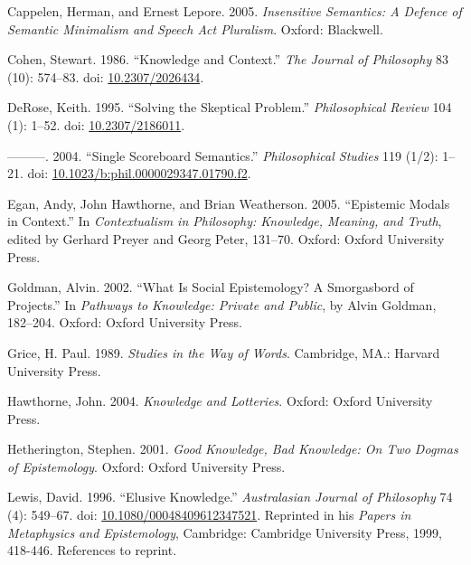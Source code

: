 \documentclass[
  10pt,
  letterpaper,
  DIV=11,
  numbers=noendperiod,
  twoside]{scrartcl}
\newlength{\cslhangindent}
\newenvironment{CSLReferences}[2] %
 {\begin{list}{}{%
  \setlength{\itemindent}{0pt}
  \setlength{\leftmargin}{0pt}
  \setlength{\parsep}{0pt}
  \ifodd #1
   \setlength{\leftmargin}{\cslhangindent}
   \setlength{\itemindent}{-1\cslhangindent}
  \fi
  \setlength{\itemsep}{#2\baselineskip}}}
 {\end{list}}
\begin{document}
\label{refs}
\begin{CSLReferences}{1}{0}
Cappelen, Herman, and Ernest Lepore. 2005. \emph{Insensitive Semantics:
A Defence of Semantic Minimalism and Speech Act Pluralism}. Oxford:
Blackwell.

Cohen, Stewart. 1986. {``Knowledge and Context.''} \emph{The Journal of
Philosophy} 83 (10): 574--83. doi:
\href{https://doi.org/10.2307/2026434}{10.2307/2026434}.

DeRose, Keith. 1995. {``Solving the Skeptical Problem.''}
\emph{Philosophical Review} 104 (1): 1--52. doi:
\href{https://doi.org/10.2307/2186011}{10.2307/2186011}.

---------. 2004. {``Single Scoreboard Semantics.''} \emph{Philosophical
Studies} 119 (1/2): 1--21. doi:
\href{https://doi.org/10.1023/b:phil.0000029347.01790.f2}{10.1023/b:phil.0000029347.01790.f2}.

Egan, Andy, John Hawthorne, and Brian Weatherson. 2005. {``{Epistemic
Modals in Context}.''} In \emph{Contextualism in Philosophy: Knowledge,
Meaning, and Truth}, edited by Gerhard Preyer and Georg Peter, 131--70.
Oxford: Oxford University Press.

Goldman, Alvin. 2002. {``What Is Social Epistemology? A Smorgasbord of
Projects.''} In \emph{Pathways to Knowledge: Private and Public}, by
Alvin Goldman, 182--204. Oxford: Oxford University Press.

Grice, H. Paul. 1989. \emph{Studies in the Way of Words}. Cambridge,
MA.: Harvard University Press.

Hawthorne, John. 2004. \emph{Knowledge and Lotteries}. Oxford: Oxford
University Press.

Hetherington, Stephen. 2001. \emph{Good Knowledge, Bad Knowledge: On Two
Dogmas of Epistemology}. Oxford: Oxford University Press.

Lewis, David. 1996. {``Elusive Knowledge.''} \emph{Australasian Journal
of Philosophy} 74 (4): 549--67. doi:
\href{https://doi.org/10.1080/00048409612347521}{10.1080/00048409612347521}.
Reprinted in his \emph{Papers in Metaphysics and Epistemology},
Cambridge: Cambridge University Press, 1999, 418-446. References to
reprint.


\end{CSLReferences}
\end{document}
